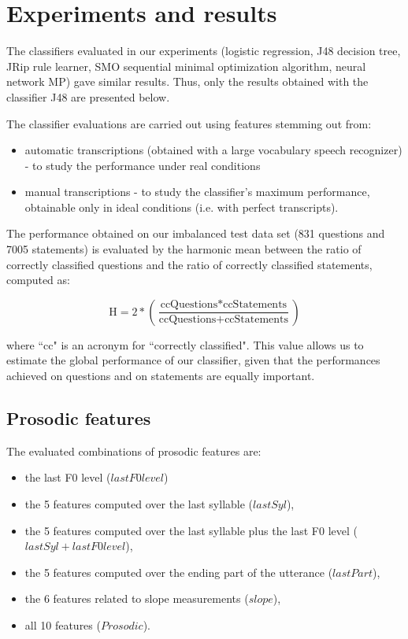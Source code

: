 \documentclass[runningheads,a4paper]{llncs}
\begin{document}
\section{Experiments and results}

The classifiers evaluated in our experiments (logistic regression, J48 decision tree, JRip rule learner, SMO sequential minimal optimization algorithm, neural network MP) gave similar results. Thus, only the results obtained with the classifier J48 are presented below.

The classifier evaluations are carried out using features stemming out from:
\begin{itemize}
\item automatic transcriptions (obtained with a large vocabulary speech recognizer) - to study the performance under real conditions
\item manual transcriptions - to study the classifier's maximum performance, obtainable only in ideal conditions (i.e. with perfect transcripts).
\end{itemize}


The performance obtained on our imbalanced test data set (831 questions and 7005 statements) is evaluated by the harmonic mean between the ratio of correctly classified questions and the ratio of correctly classified statements, computed as:

\begin{equation}
\text{H}=\text{2}*\left(\frac{\text{ccQuestions} * \text{ccStatements}}{\text{ccQuestions} + \text{ccStatements}}\right)
\end{equation}

\noindent where ``cc" is an acronym for ``correctly classified".
This value allows us to estimate the global performance of our classifier, given that the performances achieved on questions and on statements are equally important.

\subsection{Prosodic features}

The evaluated combinations of prosodic features are:
\begin{itemize}
\item the last F0 level ($lastF0level$)
\item the 5 features computed over the last syllable ($lastSyl$),
\item the 5 features computed over the last syllable plus the last F0 level ($lastSyl+lastF0level$),
\item the 5 features computed over the ending part of the utterance ($lastPart$),
\item the 6 features related to slope measurements ($slope$),
\item all 10 features ($Prosodic$).
\end{itemize}
\end{document}
